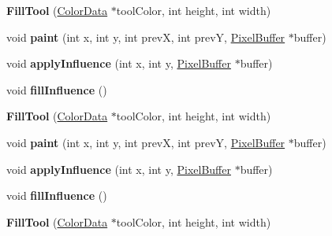 \begin{DoxyCompactItemize}
\item 
\hypertarget{classFillTool_a6abe3f5032f5e69a11cf38b94da90a62}{{\bfseries Fill\-Tool} (\hyperlink{classColorData}{Color\-Data} $\ast$tool\-Color, int height, int width)}\label{classFillTool_a6abe3f5032f5e69a11cf38b94da90a62}

\item 
\hypertarget{classFillTool_a81a3a46e5600d6250634766e8b769796}{void {\bfseries paint} (int x, int y, int prev\-X, int prev\-Y, \hyperlink{classPixelBuffer}{Pixel\-Buffer} $\ast$buffer)}\label{classFillTool_a81a3a46e5600d6250634766e8b769796}

\item 
\hypertarget{classFillTool_a8ad4d0d5b2a5379be3720c89a102ddb3}{void {\bfseries apply\-Influence} (int x, int y, \hyperlink{classPixelBuffer}{Pixel\-Buffer} $\ast$buffer)}\label{classFillTool_a8ad4d0d5b2a5379be3720c89a102ddb3}

\item 
\hypertarget{classFillTool_a888fd877cf0937e9b36be2d56f06de3e}{void {\bfseries fill\-Influence} ()}\label{classFillTool_a888fd877cf0937e9b36be2d56f06de3e}

\item 
\hypertarget{classFillTool_a6abe3f5032f5e69a11cf38b94da90a62}{{\bfseries Fill\-Tool} (\hyperlink{classColorData}{Color\-Data} $\ast$tool\-Color, int height, int width)}\label{classFillTool_a6abe3f5032f5e69a11cf38b94da90a62}

\item 
\hypertarget{classFillTool_a81a3a46e5600d6250634766e8b769796}{void {\bfseries paint} (int x, int y, int prev\-X, int prev\-Y, \hyperlink{classPixelBuffer}{Pixel\-Buffer} $\ast$buffer)}\label{classFillTool_a81a3a46e5600d6250634766e8b769796}

\item 
\hypertarget{classFillTool_a8ad4d0d5b2a5379be3720c89a102ddb3}{void {\bfseries apply\-Influence} (int x, int y, \hyperlink{classPixelBuffer}{Pixel\-Buffer} $\ast$buffer)}\label{classFillTool_a8ad4d0d5b2a5379be3720c89a102ddb3}

\item 
\hypertarget{classFillTool_a888fd877cf0937e9b36be2d56f06de3e}{void {\bfseries fill\-Influence} ()}\label{classFillTool_a888fd877cf0937e9b36be2d56f06de3e}

\item 
\hypertarget{classFillTool_a6abe3f5032f5e69a11cf38b94da90a62}{{\bfseries Fill\-Tool} (\hyperlink{classColorData}{Color\-Data} $\ast$tool\-Color, int height, int width)}\label{classFillTool_a6abe3f5032f5e69a11cf38b94da90a62}


\end{DoxyCompactItemize}
